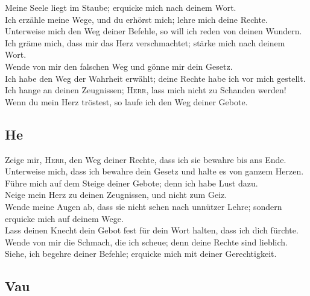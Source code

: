  Meine Seele liegt im Staube; erquicke mich nach deinem
Wort.\\
 Ich erzähle meine Wege, und du erhörst mich; lehre mich
deine Rechte.\\
 Unterweise mich den Weg deiner Befehle, so will ich
reden von deinen Wundern.\\
 Ich gräme mich, dass mir das Herz verschmachtet; stärke
mich nach deinem Wort.\\
 Wende von mir den falschen Weg und gönne mir dein
Gesetz.\\
 Ich habe den Weg der Wahrheit erwählt; deine Rechte habe
ich vor mich gestellt.\\
 Ich hange an deinen Zeugnissen; \textsc{Herr}, lass mich
nicht zu Schanden werden!\\
 Wenn du mein Herz tröstest, so laufe ich den Weg deiner
Gebote.

\hypertarget{he}{%
\subsection{He}\label{he}}

 Zeige mir, \textsc{Herr}, den Weg deiner Rechte, dass
ich sie bewahre bis ans Ende.\\
 Unterweise mich, dass ich bewahre dein Gesetz und halte
es von ganzem Herzen.\\
 Führe mich auf dem Steige deiner Gebote; denn ich habe
Lust dazu.\\
 Neige mein Herz zu deinen Zeugnissen, und nicht zum
Geiz.\\
 Wende meine Augen ab, dass sie nicht sehen nach unnützer
Lehre; sondern erquicke mich auf deinem Wege.\\
 Lass deinen Knecht dein Gebot fest für dein Wort halten,
dass ich dich fürchte.\\
 Wende von mir die Schmach, die ich scheue; denn deine
Rechte sind lieblich.\\
 Siehe, ich begehre deiner Befehle; erquicke mich mit
deiner Gerechtigkeit.

\hypertarget{vau}{%
\subsection{Vau}\label{vau}}

